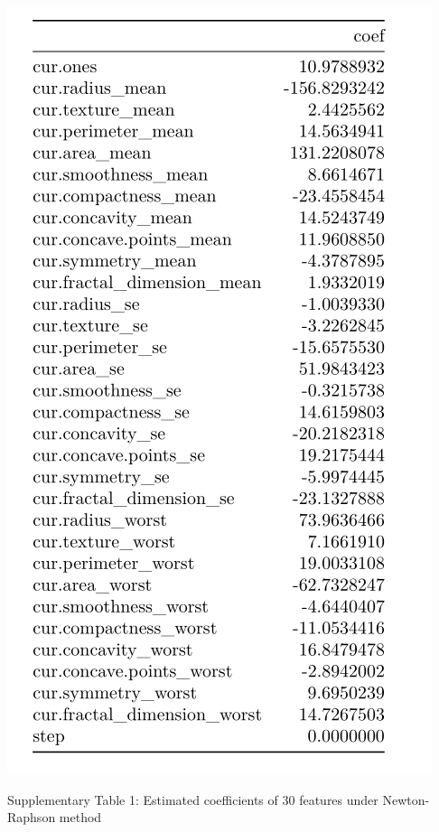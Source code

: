 \documentclass[]{article}
\begin{document}
\begin{center}
\includegraphics{./results/coef in NR of all 30 predictors.png}
\end{center}

\begin{center}
Supplementary Table  1: Estimated coefficients of 30 features under Newton-Raphson method
\end{center}
\end{document}

